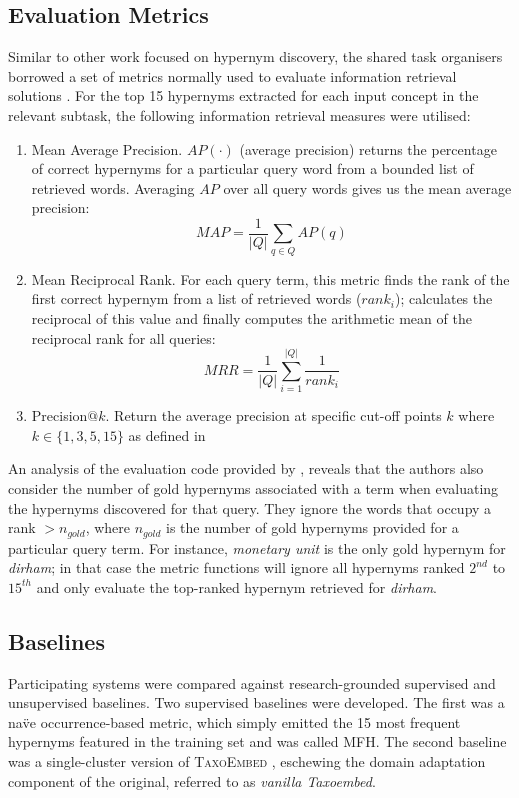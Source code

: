 \subsection{Evaluation Metrics}
Similar to other work \citep{espinosa2016supervised, ustalov2017negative} focused on hypernym discovery, the shared task organisers borrowed a set of metrics normally used to evaluate information retrieval solutions \citep{bian2008finding}.  For the top 15 hypernyms extracted for each input concept in the relevant subtask, the
following information retrieval measures were utilised:
\begin{enumerate}
    \item Mean Average Precision.  $AP(\cdot)$ (average precision) returns the percentage of correct hypernyms for a particular query word from a bounded list of retrieved words.  Averaging $AP$ over all query words gives us the mean average precision: 
    \[MAP = \frac{1}{\vert Q \vert} \sum_{q \in Q} AP(q)\]
    \item Mean Reciprocal Rank. For each query term, this metric finds the rank of the first correct hypernym from a list of retrieved words ($rank_i$); calculates the reciprocal of this value and finally computes the arithmetic mean of the reciprocal rank for all queries:
    \[MRR = \frac{1}{\vert Q \vert} \sum_{i=1}^{\vert Q \vert} \frac{1}{rank_i}\]
    \item Precision$@k$. Return the average precision at specific cut-off points $k$ where $k \in \{1, 3, 5, 15\}$ as defined in \citep{camacho2018semeval}
\end{enumerate}
An analysis of the evaluation code provided by \citeauthor{camacho2018semeval}, reveals that the authors also consider the number of gold hypernyms associated with a term when evaluating the hypernyms discovered for that query.  They ignore the words that occupy a rank $> n_{gold}$, where $n_{gold}$ is the number of gold hypernyms provided for a particular query term.  For instance, \textit{monetary unit} is the only gold hypernym for \textit{dirham}; in that case the metric functions will ignore all hypernyms ranked $2^{nd}$ to $15^{th}$ and only evaluate the top-ranked hypernym retrieved for \textit{dirham}.

\subsection{Baselines}
Participating systems were compared against research-grounded supervised and unsupervised baselines.  Two supervised baselines were developed.  The first was a na\"ve occurrence-based metric, which simply emitted the 15 most frequent hypernyms featured in the training set and was called \ac{MFH}.  The second baseline was a single-cluster version of \textsc{TaxoEmbed} \citep{espinosa2016supervised}, eschewing the domain adaptation component of the original, referred to as \textit{vanilla Taxoembed}.

